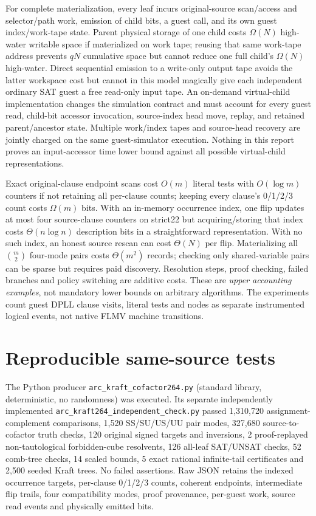 \documentclass[11pt]{article}
\begin{document}
For complete materialization, every leaf incurs original-source scan/access and selector/path work, emission of child bits, a guest call, and its own guest index/work-tape state. Parent physical storage of one child costs $\Omega(N)$ high-water writable space if materialized on work tape; reusing that same work-tape address prevents $qN$ cumulative space but cannot reduce one full child's $\Omega(N)$ high-water. Direct sequential emission to a write-only output tape avoids the latter workspace cost but cannot in this model magically give each independent ordinary SAT guest a free read-only input tape. An on-demand virtual-child implementation changes the simulation contract and must account for every guest read, child-bit accessor invocation, source-index head move, replay, and retained parent/ancestor state. Multiple work/index tapes and source-head recovery are jointly charged on the same guest-simulator execution. Nothing in this report proves an input-accessor time lower bound against all possible virtual-child representations.

Exact original-clause endpoint scans cost $O(m)$ literal tests with $O(\log m)$ counters if not retaining all per-clause counts; keeping every clause's 0/1/2/3 count costs $\Omega(m)$ bits. With an in-memory occurrence index, one flip updates at most four source-clause counters on strict22 but acquiring/storing that index costs $\Theta(n\log n)$ description bits in a straightforward representation. With no such index, an honest source rescan can cost $\Theta(N)$ per flip. Materializing all $\binom m2$ four-mode pairs costs $\Theta(m^2)$ records; checking only shared-variable pairs can be sparse but requires paid discovery. Resolution steps, proof checking, failed branches and policy switching are additive costs. These are \emph{upper accounting examples}, not mandatory lower bounds on arbitrary algorithms. The experiments count guest DPLL clause visits, literal tests and nodes as separate instrumented logical events, not native FLMV machine transitions.

\section*{Reproducible same-source tests}
The Python producer \texttt{arc\_kraft\_cofactor264.py} (standard library, deterministic, no randomness) was executed. Its separate independently implemented \texttt{arc\_kraft264\_independent\_check.py} passed 1,310,720 assignment-complement comparisons, 1,520 SS/SU/US/UU pair modes, 327,680 source-to-cofactor truth checks, 120 original signed targets and inversions, 2 proof-replayed non-tautological forbidden-cube resolvents, 126 all-leaf SAT/UNSAT checks, 52 comb-tree checks, 14 scaled bounds, 5 exact rational infinite-tail certificates and 2,500 seeded Kraft trees. No failed assertions. Raw JSON retains the indexed occurrence targets, per-clause 0/1/2/3 counts, coherent endpoints, intermediate flip trails, four compatibility modes, proof provenance, per-guest work, source read events and physically emitted bits.
\end{document}

